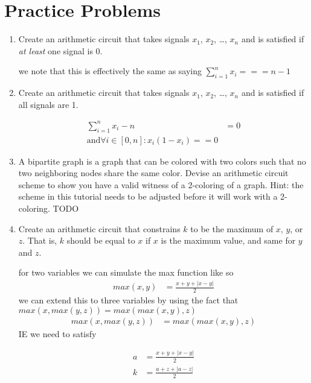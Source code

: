 \documentclass{article}
\begin{document}
\section{Practice Problems}

\begin{enumerate}
    \item Create an arithmetic circuit that takes signals $x_1$, $x_2$, \ldots, $x_n$ and is satisfied if \emph{at least} one signal is 0.

     we note that this is effectively the same as saying $\sum_{i=1}^n x_i === n-1$ 

    \item Create an arithmetic circuit that takes signals $x_1$, $x_2$, \ldots, $x_n$ and is satisfied if all signals are 1.

     \begin{align*}
          \sum_{i=1}^n x_i - n &= 0 \\
          \text{and}
          \forall i \in [0, n]: x_i(1-x_i) == 0
     \end{align*}

    \item A bipartite graph is a graph that can be colored with two colors such that no two neighboring nodes share the same color. Devise an arithmetic circuit scheme to show you have a valid witness of a 2-coloring of a graph. Hint: the scheme in this tutorial needs to be adjusted before it will work with a 2-coloring.
    TODO
    \item Create an arithmetic circuit that constrains $k$ to be the maximum of $x$, $y$, or $z$. That is, $k$ should be equal to $x$ if $x$ is the maximum value, and same for $y$ and $z$.
    
     for two variables we can simulate the max function like so
     \begin{align*}
          max(x,y) &= \frac{x+y + |x-y|}{2}
     \end{align*}
     we can extend this to three variables by using the fact that $max(x, max(y,z)) = max(max(x,y), z)$
     \begin{align*}
          max(x, max(y,z)) &= max(max(x,y), z)
     \end{align*}
     IE we need to satisfy

     \begin{align*}
          a &= \frac{x+y+|x-y|}{2} \\
          k &= \frac{a+z+|a-z|}{2}
     \end{align*}
    

\end{enumerate}
\end{document}
